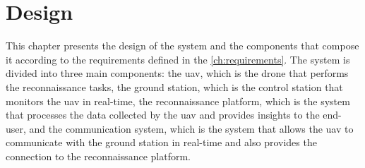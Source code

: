 \chapter{Design}\label{ch:design}

This chapter presents the design of the system and the components that compose it according to the requirements defined in the \cref{ch:requirements}. The system is divided into three main components: the \gls{uav}, which is the drone that performs the reconnaissance tasks, the ground station, which is the control station that monitors the \gls{uav} in real-time, the reconnaissance platform, which is the system that processes the data collected by the \gls{uav} and provides insights to the end-user, and the communication system, which is the system that allows the \gls{uav} to communicate with the ground station in real-time and also provides the connection to the reconnaissance platform.





